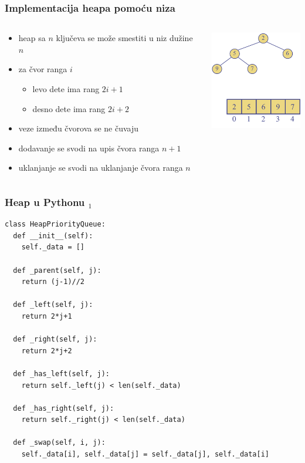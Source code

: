 \documentclass[compress,aspectratio=169]{beamer}
\begin{document}
\begin{frame}[fragile]
  \frametitle{Implementacija heapa pomoću niza}
  \begin{columns}
    \begin{column}[c]{6cm}
      \begin{itemize}
        \item heap sa $n$ ključeva se može smestiti u niz dužine $n$
        \item za čvor ranga $i$
        \begin{itemize}
          \item levo dete ima rang $2i+1$
          \item desno dete ima rang $2i+2$
        \end{itemize}
        \item veze između čvorova se ne čuvaju
        \item dodavanje se svodi na upis čvora ranga $n+1$
        \item uklanjanje se svodi na uklanjanje čvora ranga $n$
      \end{itemize}
    \end{column}
    \begin{column}[c]{5cm}
      \begin{center}
        \includegraphics[width=4cm]{asp-09-pic11.png}
      \end{center}
    \end{column}
  \end{columns}
\end{frame}

\begin{frame}
  \frametitle{Heap u Pythonu $_1$}
\begin{verbatim}
class HeapPriorityQueue:
  def __init__(self):
    self._data = []
  
  def _parent(self, j):
    return (j-1)//2
    
  def _left(self, j):
    return 2*j+1
  
  def _right(self, j):
    return 2*j+2
    
  def _has_left(self, j):
    return self._left(j) < len(self._data)
    
  def _has_right(self, j):
    return self._right(j) < len(self._data)
    
  def _swap(self, i, j):
    self._data[i], self._data[j] = self._data[j], self._data[i]
\end{verbatim}
\end{frame}
\end{document}
